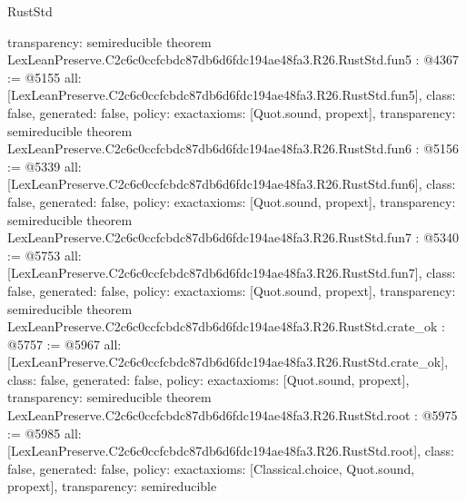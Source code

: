 \begin{lexlean}{RustStd}
\begin{coremodule}
{  transparency: semireducible
}
theorem LexLeanPreserve.C2c6c0ccfcbdc87db6d6fdc194ae48fa3.R26.RustStd.fun5 : @4367 := @5155 {
  all: [LexLeanPreserve.C2c6c0ccfcbdc87db6d6fdc194ae48fa3.R26.RustStd.fun5],
  class: false,
  generated: false,
  policy: exact{axioms: [Quot.sound, propext]},
  transparency: semireducible
}
theorem LexLeanPreserve.C2c6c0ccfcbdc87db6d6fdc194ae48fa3.R26.RustStd.fun6 : @5156 := @5339 {
  all: [LexLeanPreserve.C2c6c0ccfcbdc87db6d6fdc194ae48fa3.R26.RustStd.fun6],
  class: false,
  generated: false,
  policy: exact{axioms: [Quot.sound, propext]},
  transparency: semireducible
}
theorem LexLeanPreserve.C2c6c0ccfcbdc87db6d6fdc194ae48fa3.R26.RustStd.fun7 : @5340 := @5753 {
  all: [LexLeanPreserve.C2c6c0ccfcbdc87db6d6fdc194ae48fa3.R26.RustStd.fun7],
  class: false,
  generated: false,
  policy: exact{axioms: [Quot.sound, propext]},
  transparency: semireducible
}
theorem LexLeanPreserve.C2c6c0ccfcbdc87db6d6fdc194ae48fa3.R26.RustStd.crate_ok : @5757 := @5967 {
  all: [LexLeanPreserve.C2c6c0ccfcbdc87db6d6fdc194ae48fa3.R26.RustStd.crate_ok],
  class: false,
  generated: false,
  policy: exact{axioms: [Quot.sound, propext]},
  transparency: semireducible
}
theorem LexLeanPreserve.C2c6c0ccfcbdc87db6d6fdc194ae48fa3.R26.RustStd.root : @5975 := @5985 {
  all: [LexLeanPreserve.C2c6c0ccfcbdc87db6d6fdc194ae48fa3.R26.RustStd.root],
  class: false,
  generated: false,
  policy: exact{axioms: [Classical.choice, Quot.sound, propext]},
  transparency: semireducible
}


\end{coremodule}
\end{lexlean}
